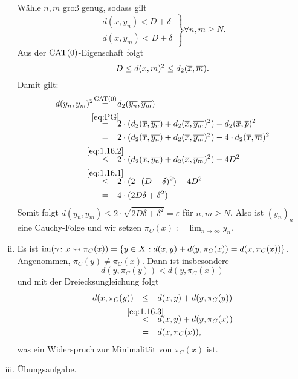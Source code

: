 \begin{beweis}
\begin{enumerate}[(i)]
		Wähle $n,m$ groß genug, sodass gilt
		\begin{equation}
			\left. \begin{array}{rr}
				d(x,y_n) < D + \delta \\
				d(x,y_m) < D + \delta
			\end{array} \right\}  \forall n,m \geq N. \label{eq:1.16.1}
		\end{equation}
		Aus der $\operatorname{CAT(0)}$-Eigenschaft folgt
		\begin{equation}
			D \leq d(x,m)^2 \leq d_2(\overline{x},\overline{m}). \label{eq:1.16.2}
		\end{equation}
		\newpage
		Damit gilt: 
		\begin{align*}
			d(y_n,y_m)^2 \stack{\CAT}{=} &d_2(\ol{y_n},\ol{y_m}) \\
			\stack{\eqref{eq:PG}}{=} &2 \cdot (d_2(\ol{x},\ol{y_n}) + d_2(\ol{x},\ol{y_m})^2) - d_2(\ol{x},\ol{p})^2 \\
			\stack{}{=} &2 \cdot (d_2(\ol{x},\ol{y_n}) + d_2(\ol{x},\ol{y_m})^2) - 4\cdot d_2(\ol{x},\ol{m})^2 \\
			\stack{\eqref{eq:1.16.2}}{\leq} &2 \cdot (d_2(\ol{x},\ol{y_n}) + d_2(\ol{x},\ol{y_m})^2) - 4D^2 \\
			\stack{\eqref{eq:1.16.1}}{\leq}  &2 \cdot (2 \cdot (D+\delta)^2) - 4D^2 \\
			\stack{}{=} &4\cdot (2D\delta + \delta^2)
		\end{align*}
		Somit folgt $d(y_n,y_m) \leq 2 \cdot \sqrt{2D\delta + \delta^2} = \varepsilon$ für $n,m \geq N$.
		Also ist $(y_n)_n$ eine Cauchy-Folge und wir setzen $\pi_C(x) := \lim_{n \rightarrow \infty} y_n$.
		\item Es ist $\operatorname{im}(\gamma\colon x \rightsquigarrow \pi_C(x)) = \{y \in X : d(x,y) + d(y,\pi_C(x)) = d(x,\pi_C(x))\}$. 
		Angenommen, $\pi_C(y) \neq \pi_C(x)$.
		Dann ist insbesondere
		\begin{equation}
			d(y,\pi_C(y)) < d(y,\pi_C(x)) \label{eq:1.16.3}
		\end{equation}
		und mit der Dreiecksungleichung folgt
		\begin{align*}
			d(x,\pi_C(y)) &\stack{}{\leq} d(x,y) + d(y,\pi_C(y)) \\
			&\stack{\eqref{eq:1.16.3}}{<} d(x,y) + d(y,\pi_C(x)) \\
			&\stack{}{=} d(x,\pi_C(x)),
		\end{align*}
		was ein Widerspruch zur Minimalität von $\pi_C(x)$ ist.
		\item Übungsaufgabe. \qedhere
	\end{enumerate}
\end{beweis}

